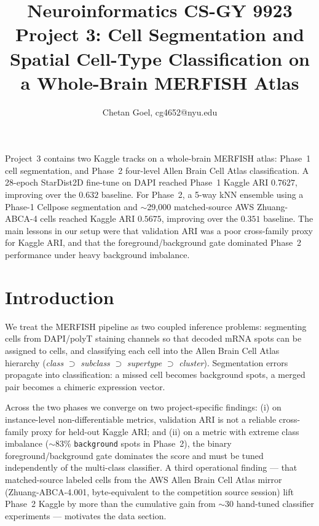 \documentclass[a4paper,11pt]{article}
\makeatletter
\renewcommand{\maketitle}{\bgroup\setlength{\parindent}{0pt}
\begin{flushleft}
  \thispagestyle{plain}
  \textbf{\@title}

  \@author
\end{flushleft}\egroup
}
\renewenvironment{abstract}
 {\small
  \begin{flushleft}
  \textbf{\abstractname}\vspace{-0.40em}\vspace{0pt}
  \end{flushleft}
  \list{}{
    \setlength{\leftmargin}{0cm}%
    \setlength{\rightmargin}{\leftmargin}%
  }%
  \item\relax}
 {\endlist}
\makeatother
\begin{document}
\title{\Large Neuroinformatics CS-GY 9923 Project 3: Cell Segmentation and Spatial Cell-Type Classification on a Whole-Brain MERFISH Atlas
\newline}
\author{Chetan Goel, cg4652@nyu.edu}

\date{}

\maketitle

\begin{abstract}
Project~3 contains two Kaggle tracks \cite{lu2026phase1, lu2026phase2} on a whole-brain MERFISH atlas: Phase~1 cell segmentation, and Phase~2 four-level Allen Brain Cell Atlas classification. A 28-epoch StarDist2D fine-tune on DAPI reached Phase~1 Kaggle ARI $\mathbf{0.7627}$, improving over the $0.632$ baseline. For Phase~2, a 5-way kNN ensemble using a Phase-1 Cellpose segmentation and $\sim$29{,}000 matched-source AWS Zhuang-ABCA-4 cells reached Kaggle ARI $\mathbf{0.5675}$, improving over the $0.351$ baseline. The main lessons in our setup were that validation ARI was a poor cross-family proxy for Kaggle ARI, and that the foreground/background gate dominated Phase~2 performance under heavy background imbalance.
\end{abstract}

\section{Introduction}

We treat the MERFISH \cite{chen2015spatially} pipeline as two coupled inference problems: segmenting cells from DAPI/polyT staining channels so that decoded mRNA spots can be assigned to cells, and classifying each cell into the Allen Brain Cell Atlas hierarchy (\emph{class} $\supset$ \emph{subclass} $\supset$ \emph{supertype} $\supset$ \emph{cluster}). Segmentation errors propagate into classification: a missed cell becomes background spots, a merged pair becomes a chimeric expression vector.

Across the two phases we converge on two project-specific findings: (i) on instance-level non-differentiable metrics, validation ARI is not a reliable cross-family proxy for held-out Kaggle ARI; and (ii) on a metric with extreme class imbalance ($\sim$83\% \texttt{background} spots in Phase~2), the binary foreground/background gate dominates the score and must be tuned independently of the multi-class classifier. A third operational finding --- that matched-source labeled cells from the AWS Allen Brain Cell Atlas mirror (Zhuang-ABCA-4.001, byte-equivalent to the competition source session) lift Phase~2 Kaggle by more than the cumulative gain from $\sim$30 hand-tuned classifier experiments --- motivates the data section.
\end{document}
